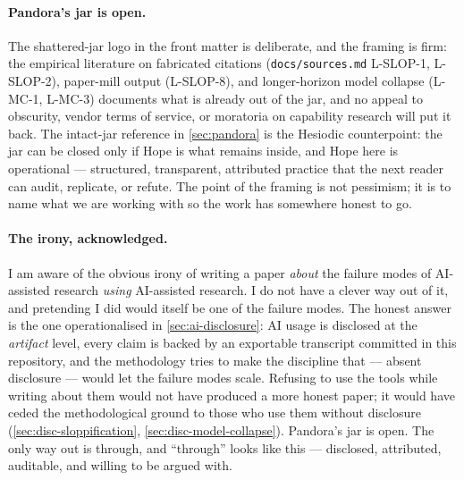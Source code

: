 \documentclass[11pt,a4paper]{article}
\begin{document}
\paragraph{Pandora's jar is open.}
The shattered-jar logo in the front matter is deliberate, and the
framing is firm: the empirical literature on fabricated citations
(\texttt{docs/sources.md} L-SLOP-1, L-SLOP-2), paper-mill output
(L-SLOP-8), and longer-horizon model collapse (L-MC-1, L-MC-3)
documents what is already out of the jar, and no appeal to obscurity,
vendor terms of service, or moratoria on capability research will put
it back. The intact-jar reference in \cref{sec:pandora} is the
Hesiodic counterpoint: the jar can be closed only if Hope is what
remains inside, and Hope here is operational --- structured,
transparent, attributed practice that the next reader can audit,
replicate, or refute. The point of the framing is not pessimism; it is
to name what we are working with so the work has somewhere honest to
go.

\paragraph{The irony, acknowledged.}
I am aware of the obvious irony of writing a paper \emph{about} the
failure modes of AI-assisted research \emph{using} AI-assisted
research. I do not have a clever way out of it, and pretending I did
would itself be one of the failure modes. The honest answer is the one
operationalised in \cref{sec:ai-disclosure}: AI usage is disclosed at
the \emph{artifact} level, every claim is backed by an exportable
transcript committed in this repository, and the methodology tries to
make the discipline that --- absent disclosure --- would let the
failure modes scale. Refusing to use the tools while writing about
them would not have produced a more honest paper; it would have ceded
the methodological ground to those who use them without disclosure
(\cref{sec:disc-sloppification}, \cref{sec:disc-model-collapse}).
Pandora's jar is open. The only way out is through, and ``through''
looks like this --- disclosed, attributed, auditable, and willing to
be argued with.
\end{document}
